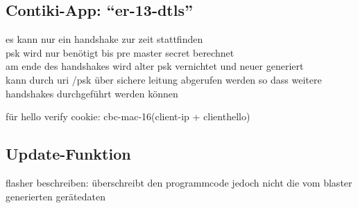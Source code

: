 \subsection{Contiki-App: "`er-13-dtls"'}
es kann nur ein handshake zur zeit stattfinden\\
psk wird nur benötigt bis pre master secret berechnet\\
am ende des handshakes wird alter psk vernichtet und neuer generiert\\
kann durch uri /psk über sichere leitung abgerufen werden so dass weitere handshakes durchgeführt werden können

für hello verify cookie: cbc-mac-16(client-ip + clienthello)

\subsection{Update-Funktion}
flasher beschreiben: überschreibt den programmcode jedoch nicht die vom blaster generierten gerätedaten